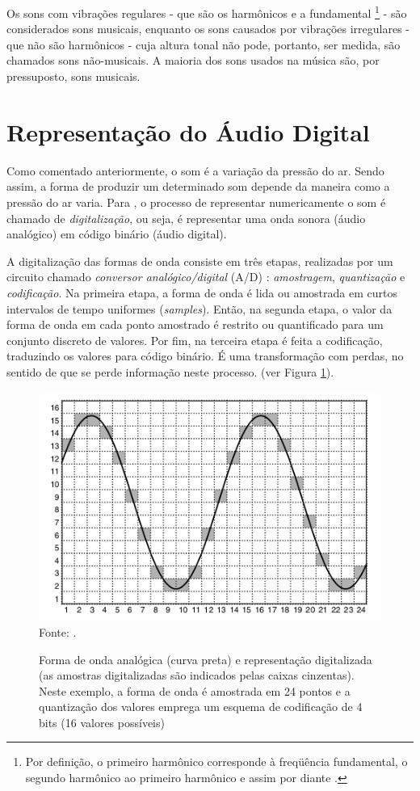 Os sons com vibrações regulares - que são os harmônicos e a fundamental \footnote{Por definição, o primeiro harmônico corresponde à freqüência fundamental, o segundo harmônico ao primeiro harmônico e assim por diante \cite{muller2007}.} - são considerados sons musicais, enquanto os sons causados por vibrações irregulares - que não são harmônicos - cuja altura tonal não pode, portanto, ser medida, são chamados sons não-musicais. A maioria dos sons usados na música são, por pressuposto, sons musicais.

\section{Representação do Áudio Digital} \label{formatos}

Como comentado anteriormente, o som é a variação da pressão do ar. Sendo assim, a forma de produzir um determinado som depende da maneira como a pressão do ar varia. Para , o processo de representar numericamente o som é chamado de \textit{digitalização}, ou seja, é representar uma onda sonora (áudio analógico) em código binário (áudio digital). 

A digitalização das formas de onda consiste em três etapas, realizadas por um circuito chamado \textit{conversor analógico/digital} (A/D) \cite{paulozuben2004}: \textit{amostragem}, \textit{quantização} e \textit{codificação}. Na primeira etapa, a forma de onda é lida ou amostrada em curtos intervalos de tempo uniformes (\textit{samples}). Então, na segunda etapa, o valor da forma de onda em cada ponto amostrado é restrito ou quantificado para um conjunto discreto de valores. Por fim, na terceira etapa é feita a codificação, traduzindo os valores para código binário. É uma transformação com perdas, no sentido de que se perde informação neste processo. (ver Figura \ref{fig:ondaAnalog}).

\begin{figure}[!htb]
   \centering
   \caption{Forma de onda analógica (curva preta) e representação digitalizada (as amostras digitalizadas são indicados pelas caixas cinzentas). Neste exemplo, a forma de onda é amostrada em 24 pontos e a quantização dos valores emprega um esquema de codificação de 4 bits (16 valores possíveis)}\label{fig:ondaAnalog} 
   \includegraphics[scale=0.8]{figuras/ondaAnalog.png}
   \\Fonte: \cite{muller2007}.
\end{figure}

